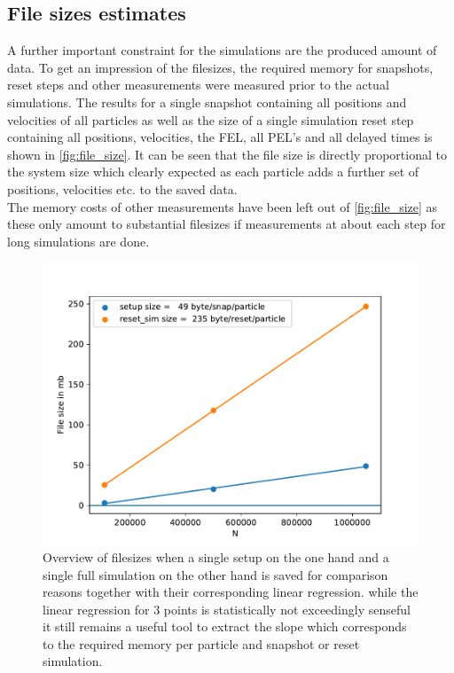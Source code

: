 \subsection{File sizes estimates}
\label{sec:file_size}
A further important constraint for the simulations are the produced amount of data. To get an impression of the filesizes, the required memory for snapshots, reset steps and other measurements were measured prior to the actual simulations. The results for a single snapshot containing all positions and velocities of all particles as well as the size of a single simulation reset step containing all positions, velocities, the FEL, all PEL's and all delayed times is shown in \autoref{fig:file_size}. It can be seen that the file size is directly proportional to the system size which clearly expected as each particle adds a further set of positions, velocities etc. to the saved data.\\
The memory costs of other measurements have been left out of \autoref{fig:file_size} as these only amount to substantial filesizes if measurements at about each step for long simulations are done.\\  

\begin{figure}[h!]
\centering
\includegraphics[width=0.7 \linewidth]{../plots/File_size.pdf}
\caption{Overview of filesizes when a single setup on the one hand and a single full simulation on the other hand is saved for comparison reasons together with their corresponding linear regression. while the linear regression for 3 points is statistically not exceedingly senseful it still remains a useful tool to extract the slope which corresponds to the required memory per particle and snapshot or reset simulation.}
\label{fig:file_size}
\end{figure}




